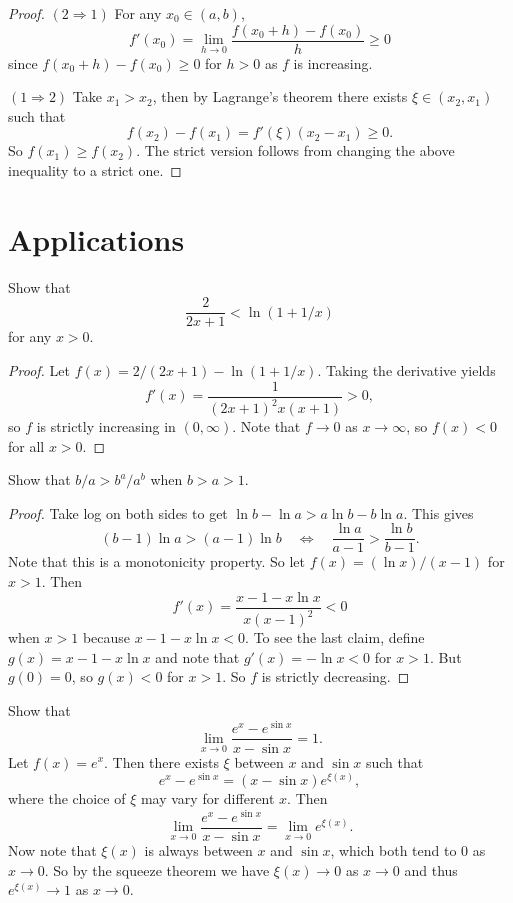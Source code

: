 \begin{proof}
  $(2 \Rightarrow 1)$ For any $x_0 \in (a, b)$,
  \[
    f'(x_0) = \lim_{h \to 0} \frac{f(x_0 + h) - f(x_0)}{h} \ge 0
  \]
  since $f(x_0 + h) - f(x_0) \ge 0$ for $h > 0$
  as $f$ is increasing.

  $(1 \Rightarrow 2)$ Take $x_1 > x_2$, then
  by Lagrange's theorem there exists $\xi \in (x_2, x_1)$
  such that
  \[f(x_2) - f(x_1) = f'(\xi)(x_2 - x_1) \ge 0.\]
  So $f(x_1) \ge f(x_2)$. The strict version follows
  from changing the above inequality to a strict one.
\end{proof}

\section{Applications}
\begin{example}
  Show that
  \[\frac{2}{2x + 1} < \ln(1 + 1 / x)\]
  for any $x > 0$.
\end{example}

\begin{proof}
  Let $f(x) = 2 / (2x + 1) - \ln(1 + 1 / x)$. Taking
  the derivative yields
  \[
    f'(x) = \frac{1}{(2x + 1)^2 x (x + 1)} > 0,
  \]
  so $f$ is strictly increasing in $(0, \infty)$.
  Note that $f \to 0$ as $x \to \infty$, so $f(x) < 0$
  for all $x > 0$.
\end{proof}

\begin{example}
  Show that $b / a > b^a / a^b$
  when $b > a > 1$.
\end{example}

\begin{proof}
  Take log on both sides to get
  $\ln b - \ln a > a \ln b - b \ln a$. This gives
  \[
    (b - 1)\ln a > (a - 1) \ln b
    \quad \iff \quad \frac{\ln a}{a - 1} > \frac{\ln b}{b - 1}.
  \]
  Note that this is a monotonicity property. So
  let $f(x) = (\ln x) / (x - 1)$ for $x > 1$. Then
  \[
    f'(x) = \frac{x - 1 - x\ln x}{x(x - 1)^2} < 0
  \]
  when $x > 1$ because $x - 1 - x \ln x < 0$. To see
  the last claim, define $g(x) = x - 1 - x \ln x$
  and note that $g'(x) = -\ln x < 0$ for $x > 1$.
  But $g(0) = 0$, so $g(x) < 0$ for $x > 1$. So $f$
  is strictly decreasing.
\end{proof}

\begin{example}
  Show that
  \[
    \lim_{x \to 0} \frac{e^x - e^{\sin x}}{x - \sin x} = 1.
  \]
  Let $f(x) = e^x$. Then there exists $\xi$ between
  $x$ and $\sin x$ such that
  \[
    e^x - e^{\sin x} = (x - \sin x) e^{\xi(x)},
  \]
  where the choice of $\xi$ may vary for different $x$.
  Then
  \[
    \lim_{x \to 0} \frac{e^x - e^{\sin x}}{x - \sin x} = 
    \lim_{x \to 0} e^{\xi(x)}.
  \]
  Now note that $\xi(x)$ is always between $x$ and
  $\sin x$, which both tend to $0$ as $x \to 0$. So by
  the squeeze theorem we have $\xi(x) \to 0$ as $x \to 0$
  and thus $e^{\xi(x)} \to 1$ as $x \to 0$.
\end{example}

